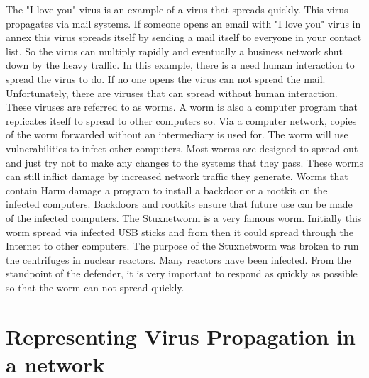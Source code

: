 The "I love you" virus is an example of a virus that spreads quickly. This virus propagates via mail systems. If someone opens an email with "I love you" virus in annex this virus spreads itself by sending a mail itself to everyone in your contact list. So the virus can multiply rapidly and eventually a business network shut down by the heavy traffic. In this example, there is a need human interaction to spread the virus to do. If no one opens the virus can not spread the mail.
Unfortunately, there are viruses that can spread without human interaction. These viruses are referred to as worms. A worm is also a computer program that replicates itself to spread to other computers so. Via a computer network, copies of the worm forwarded without an intermediary is used for. The worm will use vulnerabilities to infect other computers.
Most worms are designed to spread out and just try not to make any changes to the systems that they pass. These worms can still inflict damage by increased network traffic they generate. Worms that contain Harm damage a program to install a backdoor or a rootkit on the infected computers. Backdoors and rootkits ensure that future use can be made of the infected computers.
The Stuxnetworm is a very famous worm. Initially this worm spread via infected USB sticks and from then it could spread through the Internet to other computers. The purpose of the Stuxnetworm was broken to run the centrifuges in nuclear reactors. Many reactors have been infected. From the standpoint of the defender, it is very important to respond as quickly as possible so that the worm can not spread quickly.
\section{Representing Virus Propagation in a network}




